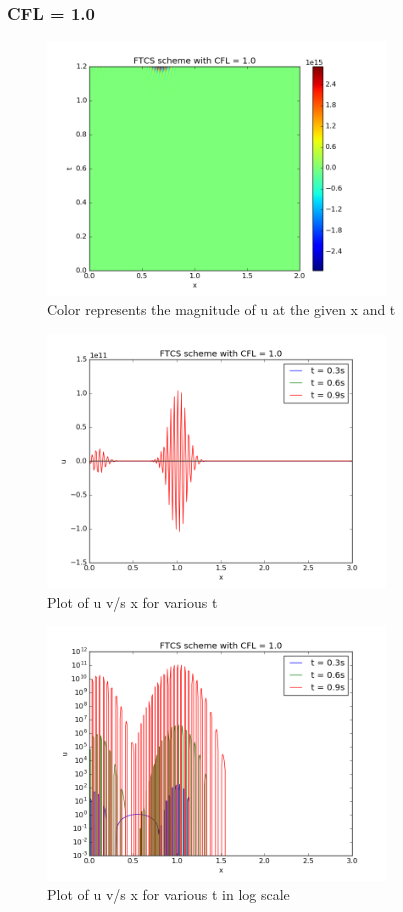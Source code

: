 \documentclass[11pt, a4paper]{article}
\begin{document}
\subsubsection{CFL = 1.0}
\begin{figure}[H]
 \centering
 \includegraphics[width = 0.8\textwidth]{FTCS2_1.png}
 \caption{Color represents the magnitude of u at the given x and t}
\end{figure}

\begin{figure}[H]
 \centering
 \includegraphics[width = 0.8\textwidth]{FTCS2_1_1.png}
 \caption{Plot of u v/s x for various t}
\end{figure}

\begin{figure}[H]
 \centering
 \includegraphics[width = 0.8\textwidth]{FTCS2_1_1_log.png}
 \caption{Plot of u v/s x for various t in log scale}
\end{figure}
\end{document}
